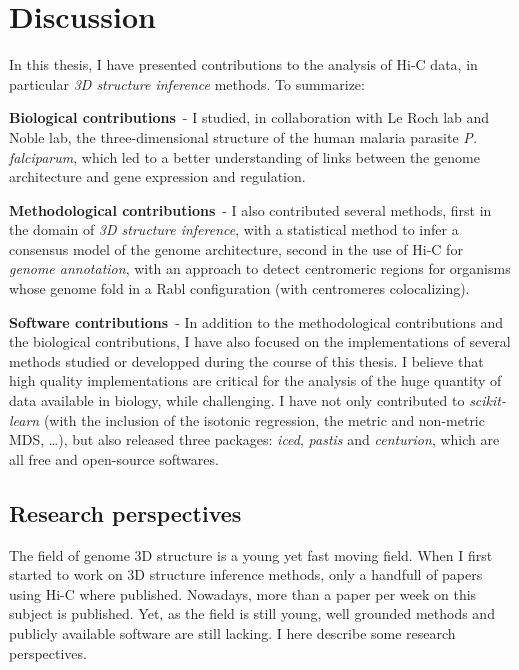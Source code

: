 
\chapter{Discussion} %

In this thesis, I have presented contributions to the analysis of Hi-C data,
in particular \textit{3D structure inference} methods. To summarize:

\textbf{Biological contributions}\ - I studied, in collaboration with Le Roch
lab and Noble lab, the three-dimensional structure of the human malaria
parasite \textit{P. falciparum}, which led to a better understanding of links
between the genome architecture and gene expression and regulation.

\textbf{Methodological contributions}\ - I also contributed several methods,
first in the domain of \textit{3D structure inference}, with a statistical
method to infer a consensus model of the genome architecture, second in the
use of Hi-C for \textit{genome annotation}, with an approach to detect
centromeric regions for organisms whose genome fold in a Rabl configuration
(with centromeres colocalizing).

\textbf{Software contributions}\ - In addition to the methodological
contributions and the biological contributions, I have also focused on the
implementations of several methods studied or developped during the course of
this thesis. I believe that high quality implementations are critical for the
analysis of the huge quantity of data available in biology, while challenging.
I have not only contributed to \textit{scikit-learn} (with the inclusion of
the isotonic regression, the metric and non-metric MDS, \dots), but also
released three packages: \textit{iced}, \textit{pastis} and
\textit{centurion}, which are all free and open-source softwares.

\section*{Research perspectives}

The field of genome 3D structure is a young yet fast moving field. When I
first started to work on 3D structure inference methods, only a handfull of
papers using Hi-C where published. Nowadays, more than a paper per week on
this subject is published. Yet, as the field is still young, well grounded
methods and publicly available software are still lacking. I here describe
some research perspectives.


